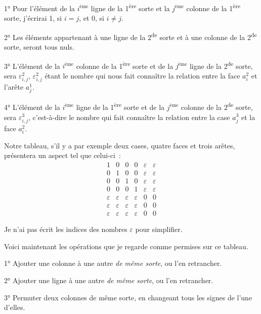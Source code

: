 \documentclass{article}
\begin{document}
1° Pour l'élément de la $i^{\text{ème}}$ ligne de la 1\textsuperscript{ère} sorte et la $j^{\text{ème}}$ colonne de la 1\textsuperscript{ère} sorte, j'écrirai 1, si $i = j$, et 0, si $i \neq j$.

2° Les éléments appartenant à une ligne de la 2\textsuperscript{de} sorte et à une colonne de la 2\textsuperscript{de} sorte, seront tous nuls.

3° L'élément de la $i^{\text{ème}}$ colonne de la 1\textsuperscript{ère} sorte et de la $j^{\text{ème}}$ ligne de la 2\textsuperscript{de} sorte, sera $\varepsilon^{2}_{i,j}$, $\varepsilon^{2}_{i,j}$ étant le nombre qui nous fait connaître la relation entre la face $a^{2}_{i}$ et l'arête $a^{1}_{j}$.

4° L'élément de la $i^{\text{ème}}$ ligne de la 1\textsuperscript{ère} sorte et de la $j^{\text{ème}}$ colonne de la 2\textsuperscript{de} sorte, sera $\varepsilon^{3}_{i,j}$, c'est-à-dire le nombre qui fait connaître la relation entre la case $a^{3}_{j}$ et la face $a^{2}_{i}$.

Notre tableau, s'il y a par exemple deux cases, quatre faces et trois arêtes, présentera un aspect tel que celui-ci~:
\[ \begin{matrix} 1 & 0 & 0 & 0 & \varepsilon & \varepsilon \\[1ex] 0 & 1 & 0 & 0 & \varepsilon & \varepsilon \\[1ex] 0 & 0 & 1 & 0 & \varepsilon & \varepsilon \\[1ex] 0 & 0 & 0 & 1 & \varepsilon & \varepsilon \\[1ex] \varepsilon & \varepsilon & \varepsilon & \varepsilon & 0 & 0 \\[1ex] \varepsilon & \varepsilon & \varepsilon & \varepsilon & 0 & 0 \\[1ex] \varepsilon & \varepsilon & \varepsilon & \varepsilon & 0 & 0 \end{matrix} \tag{1} \]

Je n'ai pas écrit les indices des nombres $\varepsilon$ pour simplifier.

Voici maintenant les opérations que je regarde comme permises sur ce tableau.

1° Ajouter une colonne à une autre \emph{de même sorte}, ou l'en retrancher.

2° Ajouter une ligne à une autre \emph{de même sorte}, ou l'en retrancher.

3° Permuter deux colonnes de même sorte, en changeant tous les signes de l'une d'elles.
\end{document}
